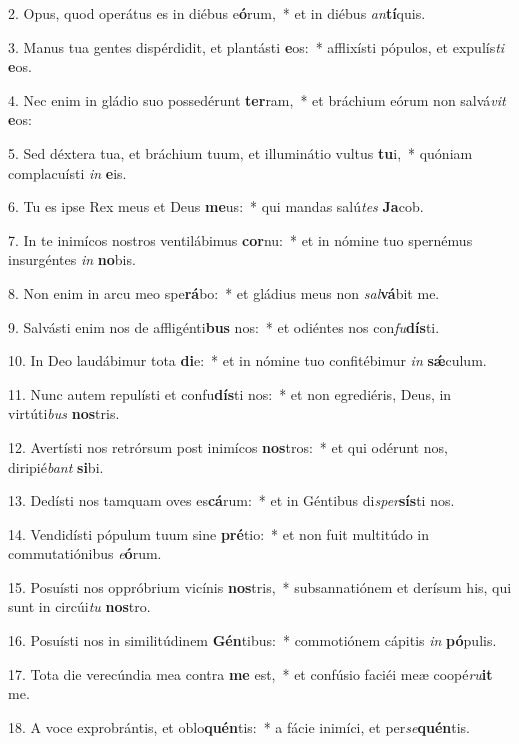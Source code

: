 2. Opus, quod operátus es in diébus e\textbf{ó}rum,~*  et in diébus \textit{an}\textbf{tí}quis.\

3. Manus tua gentes dispérdidit, et plantásti \textbf{e}os:~*  afflixísti pópulos, et expulís\textit{ti} \textbf{e}os.\

4. Nec enim in gládio suo possedérunt \textbf{ter}ram,~*  et bráchium eórum non salvá\textit{vit} \textbf{e}os:\

5. Sed déxtera tua, et bráchium tuum, et illuminátio vultus \textbf{tu}i,~*  quóniam complacuísti \textit{in} \textbf{e}is.\

6. Tu es ipse Rex meus et Deus \textbf{me}us:~*  qui mandas salú\textit{tes} \textbf{Ja}cob.\

7. In te inimícos nostros ventilábimus \textbf{cor}nu:~*  et in nómine tuo spernémus insurgéntes \textit{in} \textbf{no}bis.\

8. Non enim in arcu meo spe\textbf{rá}bo:~*  et gládius meus non \textit{sal}\textbf{vá}bit me.\

9. Salvásti enim nos de affligénti\textbf{bus} nos:~*  et odiéntes nos con\textit{fu}\textbf{dís}ti.\

10. In Deo laudábimur tota \textbf{di}e:~*  et in nómine tuo confitébimur \textit{in} \textbf{sǽ}culum.\

11. Nunc autem repulísti et confu\textbf{dís}ti nos:~*  et non egrediéris, Deus, in virtúti\textit{bus} \textbf{nos}tris.\

12. Avertísti nos retrórsum post inimícos \textbf{nos}tros:~*  et qui odérunt nos, diripié\textit{bant} \textbf{si}bi.\

13. Dedísti nos tamquam oves es\textbf{cá}rum:~*  et in Géntibus di\textit{sper}\textbf{sís}ti nos.\

14. Vendidísti pópulum tuum sine \textbf{pré}tio:~*  et non fuit multitúdo in commutatiónibus \textit{e}\textbf{ó}rum.\

15. Posuísti nos oppróbrium vicínis \textbf{nos}tris,~*  subsannatiónem et derísum his, qui sunt in circúi\textit{tu} \textbf{nos}tro.\

16. Posuísti nos in similitúdinem \textbf{Gén}tibus:~*  commotiónem cápitis \textit{in} \textbf{pó}pulis.\

17. Tota die verecúndia mea contra \textbf{me} est,~*  et confúsio faciéi meæ coopé\textit{ru}\textbf{it} me.\

18. A voce exprobrántis, et oblo\textbf{quén}tis:~*  a fácie inimíci, et per\textit{se}\textbf{quén}tis.\

